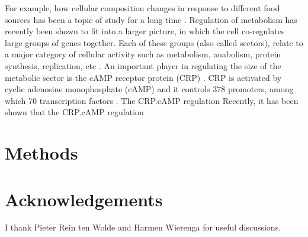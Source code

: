 For example, how cellular composition changes in response to different food sources has been a topic of study for a long time \cite{Schaechter1958}.
%
Regulation of metabolism has recently been shown to fit into a larger picture, in which the cell co-regulates large groups of genes together.
Each of these groups (also called sectors), relate to a major 
%
category of cellular activity such as 
metabolism, anabolism, protein synthesis, replication, etc 
\cite{Klumpp2009, You2013, Scott2014, Hui2015, Hermsen2015, Erickson2017}.
%
%
An important player in regulating the size of the metabolic sector is the cAMP receptor protein (CRP) \cite{Keseler2017, Grainger2005, Robinson1998, Zheng2004, Gorke2008, Fic2009, Green2014}.
%
CRP is activated by cyclic adenosine monophosphate (cAMP) and it controls 378 promoters, among which 70 transcription factors \cite{Green2014, Shimada2011}.
%
The CRP.cAMP regulation 
%
Recently, it has been shown that the CRP.cAMP regulation 

%
% 



\section{Methods}


\section*{Acknowledgements}

I thank Pieter Rein ten Wolde and Harmen Wierenga for useful discussions.

